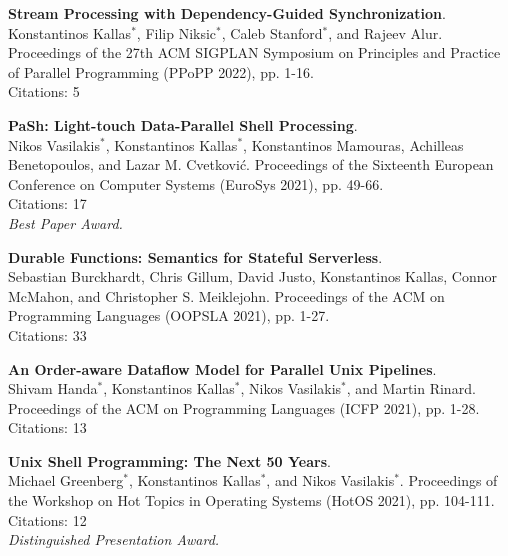 \begin{minipage}{\textwidth}
\textbf{Stream Processing with Dependency-Guided Synchronization}. \\
Konstantinos Kallas$^*$, Filip Niksic$^*$, Caleb Stanford$^*$, and Rajeev Alur.
Proceedings of the 27th ACM SIGPLAN Symposium on Principles and Practice of Parallel Programming (PPoPP 2022), pp. 1-16. \\
Citations: 5
\end{minipage}

\begin{minipage}{\textwidth}
\textbf{PaSh: Light-touch Data-Parallel Shell Processing}. \\
Nikos Vasilakis$^*$, Konstantinos Kallas$^*$, Konstantinos Mamouras, Achilleas Benetopoulos, and Lazar M. Cvetković.
Proceedings of the Sixteenth European Conference on Computer Systems (EuroSys 2021), pp. 49-66.\\
Citations: 17 \\
\emph{Best Paper Award.}
\end{minipage}

\begin{minipage}{\textwidth}
\textbf{Durable Functions: Semantics for Stateful Serverless}. \\
Sebastian Burckhardt, Chris Gillum, David Justo, Konstantinos Kallas, Connor McMahon, and Christopher S. Meiklejohn.
Proceedings of the ACM on Programming Languages (OOPSLA 2021), pp. 1-27. \\
Citations: 33
\end{minipage}

\begin{minipage}{\textwidth}
\textbf{An Order-aware Dataflow Model for Parallel Unix Pipelines}. \\
Shivam Handa$^*$, Konstantinos Kallas$^*$, Nikos Vasilakis$^*$, and Martin Rinard.
Proceedings of the ACM on Programming Languages (ICFP 2021), pp. 1-28. \\
Citations: 13
\end{minipage}    

\begin{minipage}{\textwidth}
\textbf{Unix Shell Programming: The Next 50 Years}. \\
Michael Greenberg$^*$, Konstantinos Kallas$^*$, and Nikos Vasilakis$^*$.
Proceedings of the Workshop on Hot Topics in Operating Systems (HotOS 2021), pp. 104-111. \\
Citations: 12 \\
\emph{Distinguished Presentation Award.}
\end{minipage}


